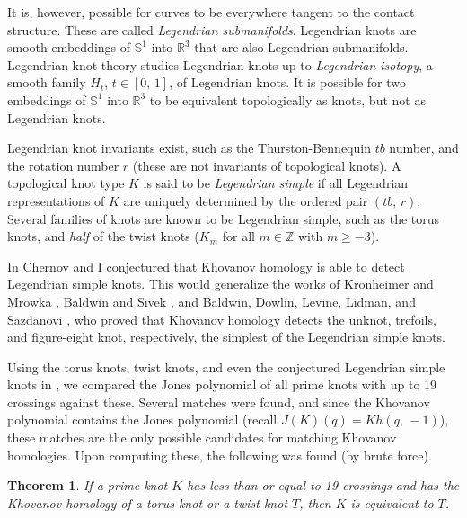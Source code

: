 \documentclass{article}
\theoremstyle{plain}
\newtheorem{theorem}{Theorem}
\begin{document}
        It is, however, possible for curves to be everywhere tangent to the
        contact structure. These are called \textit{Legendrian submanifolds}.
        Legendrian knots are smooth embeddings of $\mathbb{S}^{1}$ into
        $\mathbb{R}^{3}$ that are also Legendrian submanifolds. Legendrian
        knot theory studies Legendrian knots up to \textit{Legendrian isotopy},
        a smooth family $H_{t}$, $t\in[0,\,1]$, of Legendrian knots. It is
        possible for two embeddings of $\mathbb{S}^{1}$ into $\mathbb{R}^{3}$
        to be equivalent topologically as knots, but not as Legendrian knots.
        \par\hfill\par
        Legendrian knot invariants exist, such as the Thurston-Bennequin $tb$
        number, and the rotation number $r$ (these are not invariants of
        topological knots). A topological knot type $K$ is said to be
        \textit{Legendrian simple} if all Legendrian representations of $K$ are
        uniquely determined by the ordered pair $(tb,\,r)$. Several families of
        knots are known to be Legendrian simple, such as the torus knots,
        and \textit{half} of the twist knots ($K_{m}$ for all $m\in\mathbb{Z}$
        with $m\geq{-3}$).
        \par\hfill\par
        In \cite{ChernovMaguireLegendrianConjecture} Chernov and I conjectured
        that Khovanov homology is able to detect Legendrian simple knots. This
        would generalize the works of Kronheimer and Mrowka
        \cite{KronheimerMrowka2011KhovanovUnknot},
        Baldwin and Sivek \cite{BaldwinSivekKhovanovTrefoils}, and
        Baldwin, Dowlin, Levine, Lidman, and Sazdanovi
        \cite{BaldwinDowlinKhovanovFigureEight}, who proved that Khovanov
        homology detects the unknot, trefoils, and figure-eight knot,
        respectively, the simplest of the Legendrian simple knots.
        \par\hfill\par
        Using the torus knots, twist knots, and even the conjectured Legendrian
        simple knots in \cite{LegendrianKnotAtlas}, we compared the Jones
        polynomial of all prime knots with up to 19 crossings against these.
        Several matches were found, and since the Khovanov polynomial contains
        the Jones polynomial (recall $J(K)(q)=Kh(q,\,-1)$), these matches are
        the only possible candidates for matching Khovanov homologies. Upon
        computing these, the following was found (by brute force).
        \begin{theorem}
            If a prime knot $K$ has less than or equal to 19 crossings and has
            the Khovanov homology of a torus knot or a twist knot $T$,
            then $K$ is equivalent to $T$.
        \end{theorem}
\end{document}
